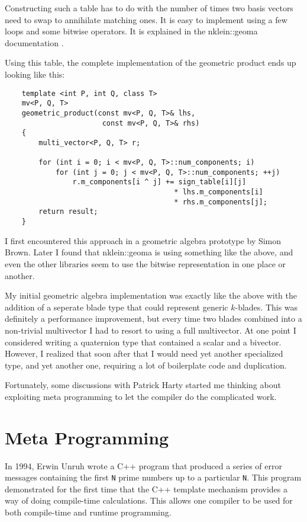 \documentclass[10pt]{article}
\begin{document}
Constructing such a table has to do with the number of times two basis vectors need to swap to annihilate matching ones. It is easy to implement using a few loops and some bitwise operators. It is explained in the nklein::geoma documentation \cite{bib:nklein docs}.

Using this table, the complete implementation of the geometric product ends up looking like this:

\begin{verbatim}
    template <int P, int Q, class T>
    mv<P, Q, T>
    geometric_product(const mv<P, Q, T>& lhs,
                       const mv<P, Q, T>& rhs)
    {
        multi_vector<P, Q, T> r;

        for (int i = 0; i < mv<P, Q, T>::num_components; i)
            for (int j = 0; j < mv<P, Q, T>::num_components; ++j)
                r.m_components[i ^ j] += sign_table[i][j]
                                        * lhs.m_components[i]
                                        * rhs.m_components[j];
        return result;
    }
\end{verbatim}

I first encountered this approach in a geometric algebra prototype by Simon Brown. Later I found that nklein::geoma is using something like the above, and even the other libraries seem to use the bitwise representation in one place or another.

My initial geometric algebra implementation was exactly like the above with the addition of a seperate blade type that could represent generic $k$-blades. This was definitely a performance improvement, but every time two blades combined into a non-trivial multivector I had to resort to using a full multivector. At one point I considered writing a quaternion type that contained a scalar and a bivector. However, I realized that soon after that I would need yet another specialized type, and yet another one, requiring a lot of boilerplate code and duplication.
 
Fortunately, some discussions with Patrick Harty started me thinking about exploiting meta programming to let the compiler do the complicated work.

\section{Meta Programming}

In 1994, Erwin Unruh wrote a C++ program that produced a series of error messages containing the first \verb"N" prime numbers up to a particular \verb"N". \cite{bib:erwin unruh} This program demonstrated for the first time that the C++ template mechanism provides a way of doing compile-time calculations. This allows one compiler to be used for both compile-time and runtime programming.
\end{document}
